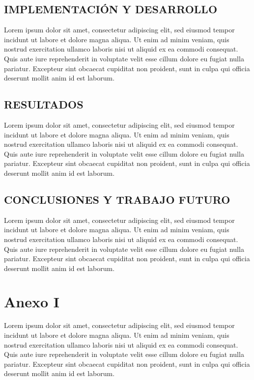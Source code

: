 \documentclass[12pt,a4paper,twoside]{article} %
\begin{document}
\section{IMPLEMENTACIÓN Y DESARROLLO}
\label{sec:implementacionydesarrollo}

Lorem ipsum dolor sit amet, consectetur adipiscing elit, sed eiusmod tempor incidunt ut labore et dolore magna aliqua. Ut enim ad minim veniam, quis nostrud exercitation ullamco laboris nisi ut aliquid ex ea commodi consequat. Quis aute iure reprehenderit in voluptate velit esse cillum dolore eu fugiat nulla pariatur. Excepteur sint obcaecat cupiditat non proident, sunt in culpa qui officia deserunt mollit anim id est laborum.


\section{RESULTADOS}
\label{sec:resultados}

Lorem ipsum dolor sit amet, consectetur adipiscing elit, sed eiusmod tempor incidunt ut labore et dolore magna aliqua. Ut enim ad minim veniam, quis nostrud exercitation ullamco laboris nisi ut aliquid ex ea commodi consequat. Quis aute iure reprehenderit in voluptate velit esse cillum dolore eu fugiat nulla pariatur. Excepteur sint obcaecat cupiditat non proident, sunt in culpa qui officia deserunt mollit anim id est laborum.


\section{CONCLUSIONES Y TRABAJO FUTURO}
\label{sec:conclusiones}

Lorem ipsum dolor sit amet, consectetur adipiscing elit, sed eiusmod tempor incidunt ut labore et dolore magna aliqua. Ut enim ad minim veniam, quis nostrud exercitation ullamco laboris nisi ut aliquid ex ea commodi consequat. Quis aute iure reprehenderit in voluptate velit esse cillum dolore eu fugiat nulla pariatur. Excepteur sint obcaecat cupiditat non proident, sunt in culpa qui officia deserunt mollit anim id est laborum.


\appendix
\clearpage
\appendixpage
\addappheadtotoc

\chapter{\textbf{Anexo I\\}}
Lorem ipsum dolor sit amet, consectetur adipiscing elit, sed eiusmod tempor incidunt ut labore et dolore magna aliqua. Ut enim ad minim veniam, quis nostrud exercitation ullamco laboris nisi ut aliquid ex ea commodi consequat. Quis aute iure reprehenderit in voluptate velit esse cillum dolore eu fugiat nulla pariatur. Excepteur sint obcaecat cupiditat non proident, sunt in culpa qui officia deserunt mollit anim id est laborum.\\
\end{document}
